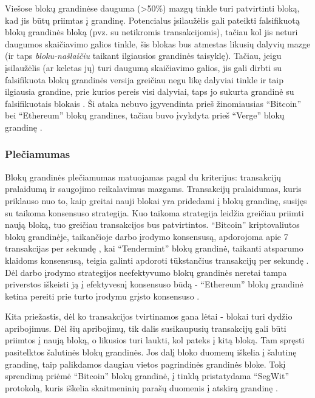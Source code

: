 Viešose blokų grandinėse dauguma (>50\%) mazgų tinkle turi patvirtinti bloką, kad jis būtų priimtas į grandinę. Potencialus įsilaužėlis gali pateikti
falsifikuotą blokų grandinės bloką (pvz. su netikromis transakcijomis), tačiau kol jis neturi daugumos skaičiavimo galios tinkle, šis blokas bus
atmestas likusių dalyvių mazge (ir taps \textit{bloku-našlaičiu} taikant ilgiausios grandinės taisyklę). Tačiau, jeigu įsilaužėlis (ar keletas jų)
turi daugumą skaičiavimo galios, jis gali dirbti su falsifikuota blokų grandinės versija greičiau negu likę dalyviai tinkle ir taip ilgiausia grandine, prie kurios
pereis visi dalyviai, taps jo sukurta grandinė su falsifikuotais blokais \cite{Zheng2017}. Ši ataka nebuvo įgyvendinta prieš žinomiausias \enquote{Bitcoin} bei \enquote{Ethereum} blokų grandines, tačiau
buvo įvykdyta prieš \enquote{Verge} blokų grandinę \cite{Sedgwick2018}.

\subsubsection{Plečiamumas}

Blokų grandinės plečiamumas matuojamas pagal du kriterijus: transakcijų pralaidumą ir saugojimo reikalavimus mazgams. Transakcijų pralaidumas, kuris priklauso nuo to,
kaip greitai nauji blokai yra pridedami į blokų grandinę, susijęs su taikoma konsensuso strategija.
Kuo taikoma strategija leidžia greičiau priimti naują bloką, tuo greičiau transakcijos bus patvirtintos. \enquote{Bitcoin} kriptovaliutos blokų grandinėje, taikančioje darbo įrodymo konsensusą,
apdorojoma apie 7 transakcijas per sekundę \cite{Zheng2017}, kai \enquote{Tendermint} blokų grandinė, taikanti
atsparumo klaidoms konsensusą, teigia galinti apdoroti tūkstančius transakcijų per sekundę \cite{Tendermint2017}. Dėl darbo įrodymo strategijos neefektyvumo
blokų grandinės neretai tampa priverstos iškeisti ją į efektyvesnį konsensuso būdą - \enquote{Ethereum} blokų grandinė ketina pereiti prie turto įrodymu grįsto konsensuso \cite{Ethereum}.

Kita priežastis, dėl ko transakcijos tvirtinamos gana lėtai - blokai turi dydžio apribojimus. Dėl šių apribojimų, tik dalis susikaupusių transakcijų gali būti priimtos
į naują bloką, o likusios turi laukti, kol pateks į kitą bloką. Tam spręsti pasitelktos šalutinės blokų grandinės. Jos dalį bloko duomenų iškelia į šalutinę grandinę,
taip palikdamos daugiau vietos pagrindinės grandinės bloke. Tokį sprendimą priėmė \enquote{Bitcoin} blokų grandinė, į tinklą pristatydama \enquote{SegWit} protokolą, kuris iškelia skaitmeninių
parašų duomenis į atskirą grandinę \cite{Segwit}.

